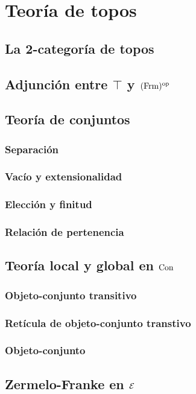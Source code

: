 \chapter{Teoría de topos}

\section{La 2-categoría de topos}

\section{Adjunción entre $\top$ y $({\mathrm{Frm}})^{\mathrm{op}}$}

\section{Teoría de conjuntos}

\subsection{Separación}

\subsection{Vacío y extensionalidad}

\subsection{Elección y finitud}

\subsection{Relación de pertenencia}

\section{Teoría local y global en ${\mathrm{Con}}$}

\subsection{Objeto-conjunto transitivo}

\subsection{Retícula de objeto-conjunto transtivo}

\subsection{Objeto-conjunto}

\section{Zermelo-Franke en ${\mathcal E}$}